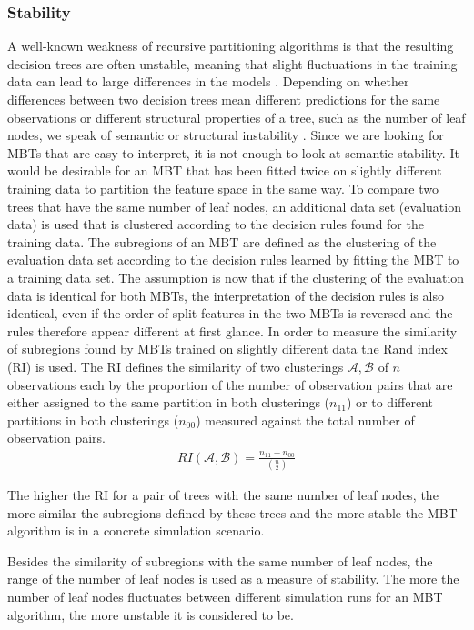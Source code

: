 \subsubsection{Stability}
A well-known weakness of recursive partitioning algorithms is that the resulting decision trees are often unstable, meaning that slight fluctuations in the training data can lead to large differences in the models \citep{Fokkema.2020}.
Depending on whether differences between two decision trees mean different predictions for the same observations or different structural properties of a tree, such as the number of leaf nodes, we speak of semantic or structural instability \citep{Wang.2018}. 
Since we are looking for MBTs that are easy to interpret, it is not enough to look at semantic stability. It would be desirable for an MBT that has been fitted twice on slightly different training data to partition the feature space in the same way. To compare two trees that have the same number of leaf nodes, an additional data set (evaluation data) is used that is clustered according to the decision rules found for the training data. The subregions of an MBT are defined as the clustering of the evaluation data set according to the decision rules learned by fitting the MBT to a training data set. 
The assumption is now that if the clustering of the evaluation data is identical for both MBTs, the interpretation of the decision rules is also identical, even if the order of split features in the two MBTs is reversed and the rules therefore appear different at first glance.
In order to measure the similarity of subregions found by MBTs trained on slightly different data the Rand index (RI) \citep{Rand.1971} is used. The RI defines the similarity of two clusterings $\mathcal{A}, \mathcal{B}$ of $n$ observations each by the proportion of  the number of observation pairs that are either assigned to the same partition in both clusterings ($n_{11}$) or to different partitions in both clusterings ($n_{00}$) measured against the total number of observation pairs. 
\begin{align}
    RI(\mathcal{A}, \mathcal{B}) = \frac{n_{11} + n_{00}}{\binom{n}{2}}
\end{align}
\citep{Gates.2017}

The higher the RI for a pair of trees with the same number of leaf nodes, the more similar the subregions defined by these trees and the more stable the MBT algorithm is in a concrete simulation scenario. 


Besides the similarity of subregions with the same number of leaf nodes, the range of the number of leaf nodes is used as a measure of stability. The more the number of leaf nodes fluctuates between different simulation runs for an MBT algorithm, the more unstable it is considered 
 to be.

